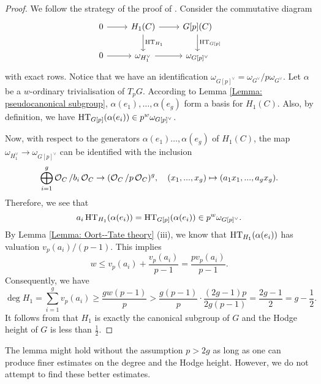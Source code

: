 \begin{proof}
We follow the strategy of the proof of \cite[Lemma 2.14]{CHJ-2017}. Consider the commutative diagram \[
    \begin{tikzcd}
        0 \arrow[r] & H_1(C) \arrow[r]\arrow[d, "\HT_{H_1}"] & G[p](C)\arrow[d, "\HT_{G[p]}"]\\
        0 \arrow[r] & {\omega}_{H_1^{\vee}} \arrow[r] & {\omega}_{G[p]^{\vee}}
    \end{tikzcd}
\]  with exact rows. Notice that we have an identification ${\omega}_{G[p]^{\vee}} = {\omega}_{G^{\vee}}/p{\omega}_{G^{\vee}}$. Let $\alpha$ be a $w$-ordinary trivialisation of $T_pG$. According to Lemma \ref{Lemma: pseudocanonical subgroup}, $\alpha(e_1), \ldots, \alpha(e_g)$ form a basis for $H_1(C)$. Also, by definition, we have $\operatorname{HT}_{G[p]}(\alpha(e_i))\in p^w {\omega}_{G[p]^{\vee}}$. 

Now, with respect to the generators $\alpha(e_1) \ldots, \alpha(e_g)$ of $H_1(C)$, the map $\omega_{H_1^{\vee}} \rightarrow \omega_{G[p]^{\vee}}$ can be identified with the inclusion \[
    \bigoplus_{i=1}^g \operatorname{\mathcal{O}}_C/b_i\operatorname{\mathcal{O}}_C \rightarrow (\operatorname{\mathcal{O}}_C/p\operatorname{\mathcal{O}}_C)^g, \quad (x_1, ..., x_g)\mapsto (a_1x_1, ..., a_gx_g).
\] 
Therefore, we see that \[
    a_i\operatorname{HT}_{H_1}(\alpha(e_i)) = \operatorname{HT}_{G[p]}(\alpha(e_i)) \in p^w {\omega}_{G[p]^{\vee}}.
\]  
By Lemma \ref{Lemma: Oort--Tate theory} (iii), we know that $\operatorname{HT}_{H_1}(\alpha(e_i))$ has valuation $v_p(a_i)/(p-1)$. This implies \[
    w \leq v_p(a_i) + \frac{v_p(a_i)}{p-1} = \frac{p v_p(a_i)}{p-1}. 
\] Consequently, we have \[
    \deg H_1 = \sum_{i=1}^g v_p(a_i) \geq \frac{gw(p-1)}{p} > \frac{g(p-1)}{p}\cdot \frac{(2g-1)p}{2g(p-1)} = \frac{2g-1}{2} = g - \frac{1}{2}.
\] It follows from \cite[Proposition 3.1.2]{AIP-2015} that $H_1$ is exactly the canonical subgroup of $G$ and the Hodge height of $G$ is less than $\frac{1}{2}$.
\end{proof}

\begin{Remark}
\normalfont The lemma might hold without the assumption $p>2g$ as long as one can produce finer estimates on the degree and the Hodge height. However, we do not attempt to find these better estimates.
\end{Remark}

